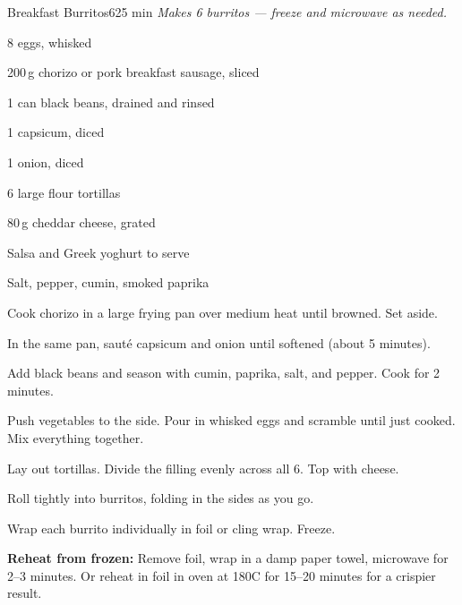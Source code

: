 \begin{recipebox}{Breakfast Burritos}{6}{25 min}
\textit{Makes 6 burritos --- freeze and microwave as needed.}

\begin{ingredients}
  \item 8 eggs, whisked
  \item 200\,g chorizo or pork breakfast sausage, sliced
  \item 1 can black beans, drained and rinsed
  \item 1 capsicum, diced
  \item 1 onion, diced
  \item 6 large flour tortillas
  \item 80\,g cheddar cheese, grated
  \item Salsa and Greek yoghurt to serve
  \item Salt, pepper, cumin, smoked paprika
\end{ingredients}

\begin{method}
  \item Cook chorizo in a large frying pan over medium heat until browned. Set aside.
  \item In the same pan, saut\'{e} capsicum and onion until softened (about 5 minutes).
  \item Add black beans and season with cumin, paprika, salt, and pepper. Cook for 2 minutes.
  \item Push vegetables to the side. Pour in whisked eggs and scramble until just cooked. Mix everything together.
  \item Lay out tortillas. Divide the filling evenly across all 6. Top with cheese.
  \item Roll tightly into burritos, folding in the sides as you go.
  \item Wrap each burrito individually in foil or cling wrap. Freeze.
\end{method}

\begin{notelist}
  \item \textbf{Reheat from frozen:} Remove foil, wrap in a damp paper towel, microwave for 2--3 minutes. Or reheat in foil in oven at 180\textdegree C for 15--20 minutes for a crispier result.
\end{notelist}
\end{recipebox}
